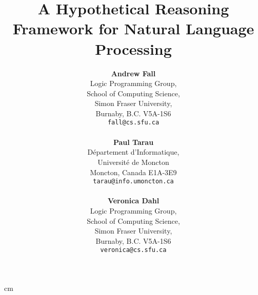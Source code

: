 \batchmode
\makeatletter
{}

 cm
\textheight 21.5cm









\title{\vspace{-56pt} A Hypothetical Reasoning Framework for Natural Language Processing}




\author{
   {\bf Andrew Fall} \\ 
	Logic Programming Group, \\ 
	School of Computing Science, \\ 
	Simon Fraser University, \\ 
	Burnaby, B.C. \hspace{1em} V5A-1S6 \\ 
	{\tt fall@cs.sfu.ca} \\ 
        \mbox{~}\\ 
   {\bf Paul Tarau} \\ 
	D\'{e}partement d'Informatique, \\ 
	Universit\'{e} de Moncton \\ 
	Moncton, Canada \hspace{1em} E1A-3E9 \\ 
	{\tt tarau@info.umoncton.ca} \\ 
        \mbox{~}\\ 
   {\bf Veronica Dahl} \\ 
	Logic Programming Group, \\ 
	School of Computing Science, \\ 
	Simon Fraser University, \\ 
	Burnaby, B.C. \hspace{1em} V5A-1S6 \\ 
	{\tt veronica@cs.sfu.ca}	
    }




\date{}


\newtheorem {theorem}{Theorem}[section]

\newtheorem {lemma}[theorem]{Lemma}

\newtheorem {definition}{Definition}[section]

\makeatother
\newenvironment{tex2html_wrap}{}{}
\newwrite\lthtmlwrite
\def\lthtmltypeout#1{{\let\protect\string\immediate\write\lthtmlwrite{#1}}}%
\newbox\sizebox

